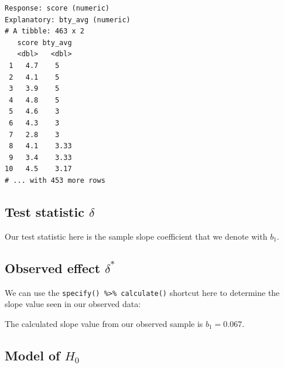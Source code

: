 \documentclass[12pt,]{krantz}
\makeatletter
\newenvironment{Shaded}{\begin{snugshade}}{\end{snugshade}}
\newcommand{\KeywordTok}[1]{\textcolor[rgb]{0.27,0.27,0.27}{\textbf{#1}}}
\newcommand{\DataTypeTok}[1]{\textcolor[rgb]{0.27,0.27,0.27}{#1}}
\newcommand{\StringTok}[1]{\textcolor[rgb]{0.5,0.5,0.5}{#1}}
\newcommand{\OperatorTok}[1]{\textcolor[rgb]{0.43,0.43,0.43}{\textbf{#1}}}
\newcommand{\NormalTok}[1]{#1}
\newenvironment{kframe}{%
\medskip{}
\setlength{\fboxsep}{.8em}
 \def\at@end@of@kframe{}%
 \ifinner\ifhmode%
  \def\at@end@of@kframe{\end{minipage}}%
  \begin{minipage}{\columnwidth}%
 \fi\fi%
 \def\FrameCommand##1{\hskip\@totalleftmargin \hskip-\fboxsep
 \colorbox{shadecolor}{##1}\hskip-\fboxsep
     \hskip-\linewidth \hskip-\@totalleftmargin \hskip\columnwidth}%
 \MakeFramed {\advance\hsize-\width
   \@totalleftmargin\z@ \linewidth\hsize
   \@setminipage}}%
 {\par\unskip\endMakeFramed%
 \at@end@of@kframe}
\renewenvironment{Shaded}{\begin{kframe}}{\end{kframe}}
\makeatother
\begin{document}
\begin{Shaded}
\end{Shaded}

\begin{verbatim}
Response: score (numeric)
Explanatory: bty_avg (numeric)
# A tibble: 463 x 2
   score bty_avg
   <dbl>   <dbl>
 1   4.7    5   
 2   4.1    5   
 3   3.9    5   
 4   4.8    5   
 5   4.6    3   
 6   4.3    3   
 7   2.8    3   
 8   4.1    3.33
 9   3.4    3.33
10   4.5    3.17
# ... with 453 more rows
\end{verbatim}

\subsection{\texorpdfstring{Test statistic
\(\delta\)}{Test statistic \textbackslash{}delta}}\label{test-statistic-delta-1}

Our test statistic here is the sample slope coefficient that we denote
with \(b_1\).

\subsection{\texorpdfstring{Observed effect
\(\delta^*\)}{Observed effect \textbackslash{}delta\^{}*}}\label{observed-effect-delta-1}

We can use the \texttt{specify()\ \%\textgreater{}\%\ calculate()}
shortcut here to determine the slope value seen in our observed data:

\begin{Shaded}
\end{Shaded}

The calculated slope value from our observed sample is \(b_1 = 0.067\).

\subsection{\texorpdfstring{Model of
\(H_0\)}{Model of H\_0}}\label{model-of-h_0-1}
\end{document}
